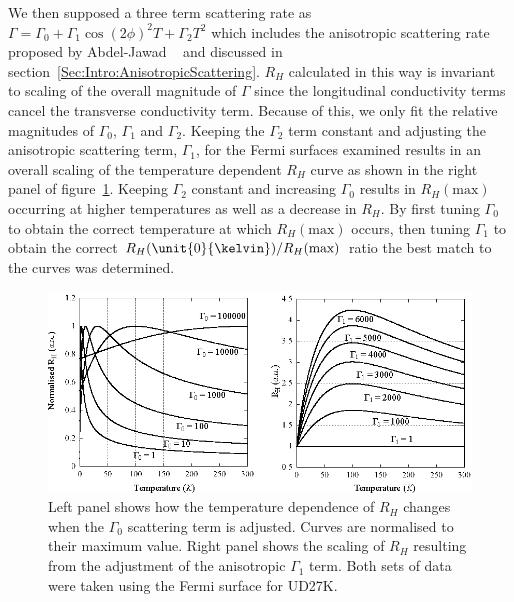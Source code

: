 We then supposed a three term scattering rate  as $\Gamma = \Gamma_0 + \Gamma_1 \cos(2\phi)^2 T + \Gamma_2 T^2$ which includes the anisotropic scattering rate proposed by Abdel-Jawad \etal~\cite{Abdel-Jawad2007} and discussed in section~\ref{Sec:Intro:AnisotropicScattering}. $R_H$ calculated in this way is invariant to scaling of the overall magnitude of $\Gamma$ since the longitudinal conductivity terms cancel the transverse conductivity term. Because of this, we only fit the relative magnitudes of $\Gamma_0$, $\Gamma_1$ and $\Gamma_2$. Keeping the $\Gamma_2$ term constant and adjusting the anisotropic scattering term, $\Gamma_1$, for the Fermi surfaces examined results in an overall scaling of the temperature dependent $R_H$ curve as shown in the right panel of figure~\ref{Fig:ResH:OngBehaviour}. Keeping $\Gamma_2$ constant and increasing $\Gamma_0$ results in $R_H(\textrm{max})$ occurring at higher temperatures as well as a decrease in $R_H$. By first tuning $\Gamma_0$ to obtain the correct temperature at which $R_H(\textrm{max})$ occurs, then tuning $\Gamma_1$ to obtain the correct $R_H(\unit{0}{\kelvin})/R_H(\textrm{max})$ ratio the best match to the curves was determined.
\begin{figure}[htbp]
    \begin{center}
        \includegraphics[scale=1.1]{Chapter-HallBSCO/Figures/OngBehaviour/OngBehaviour}
        \caption{Left panel shows how the temperature dependence of $R_H$ changes when the $\Gamma_0$ scattering term is adjusted. Curves are normalised to their maximum value. Right panel shows the scaling of $R_H$ resulting from the adjustment of the anisotropic $\Gamma_1$ term. Both sets of data were taken using the Fermi surface for UD27K.}
        \label{Fig:ResH:OngBehaviour}
    \end{center}
\end{figure}

